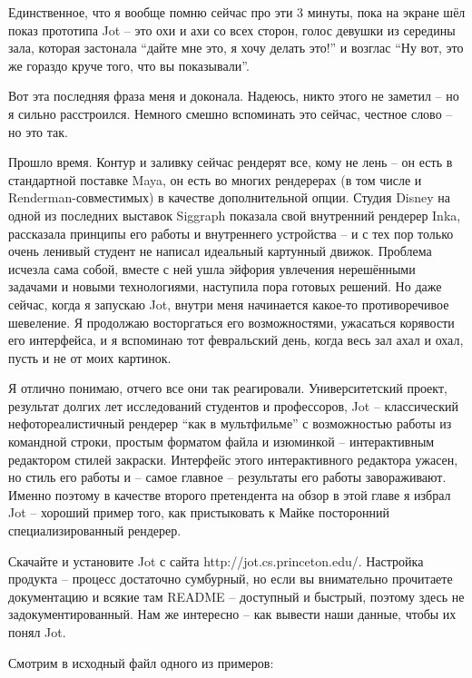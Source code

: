  Единственное, что я вообще помню сейчас про эти 3
    минуты, пока на экране шёл показ прототипа Jot – это охи и ахи со
    всех сторон, голос девушки из середины зала, которая застонала
    “дайте мне это, я хочу делать это!” и возглас “Ну вот, это же
    гораздо круче того, что вы показывали”.
  

 Вот эта последняя фраза меня и доконала. Надеюсь,
    никто этого не заметил – но я сильно расстроился. Немного смешно
    вспоминать это сейчас, честное слово – но это так.
  

 Прошло время. Контур и заливку сейчас рендерят все,
    кому не лень – он есть в стандартной поставке Maya, он есть во
    многих рендерерах (в том числе и Renderman-совместимых) в качестве
    дополнительной опции. Студия Disney на одной из последних выставок
    Siggraph показала свой внутренний рендерер Inka, рассказала
    принципы его работы и внутреннего устройства – и с тех пор только
    очень ленивый студент не написал идеальный картунный движок.
    Проблема исчезла сама собой, вместе с ней ушла эйфория увлечения
    нерешёнными задачами и новыми технологиями, наступила пора готовых
    решений. Но даже сейчас, когда я запускаю Jot, внутри меня
    начинается какое-то противоречивое шевеление. Я продолжаю
    восторгаться его возможностями, ужасаться корявости его интерфейса,
    и я вспоминаю тот февральский день, когда весь зал ахал и охал,
    пусть и не от моих картинок.
  

 Я отлично понимаю, отчего все они так реагировали.
    Университетский проект, результат долгих лет исследований студентов
    и профессоров, Jot – классический нефотореалистичный рендерер “как
    в мультфильме” с возможностью работы из командной строки, простым
    форматом файла и изюминкой – интерактивным редактором стилей
    закраски. Интерфейс этого интерактивного редактора ужасен, но стиль
    его работы и – самое главное – результаты его работы завораживают.
    Именно поэтому в качестве второго претендента на обзор в этой главе
    я избрал Jot – хороший пример того, как пристыковать к Майке
    посторонний специализированный рендерер.
  

 Скачайте и установите Jot с сайта http://jot.cs.princeton.edu/.
    Настройка продукта – процесс достаточно сумбурный, но если вы
    внимательно прочитаете документацию и всякие там README – доступный
    и быстрый, поэтому здесь не задокументированный. Нам же интересно –
    как вывести наши данные, чтобы их понял Jot.
  

 Смотрим в исходный файл одного из
    примеров:
  

